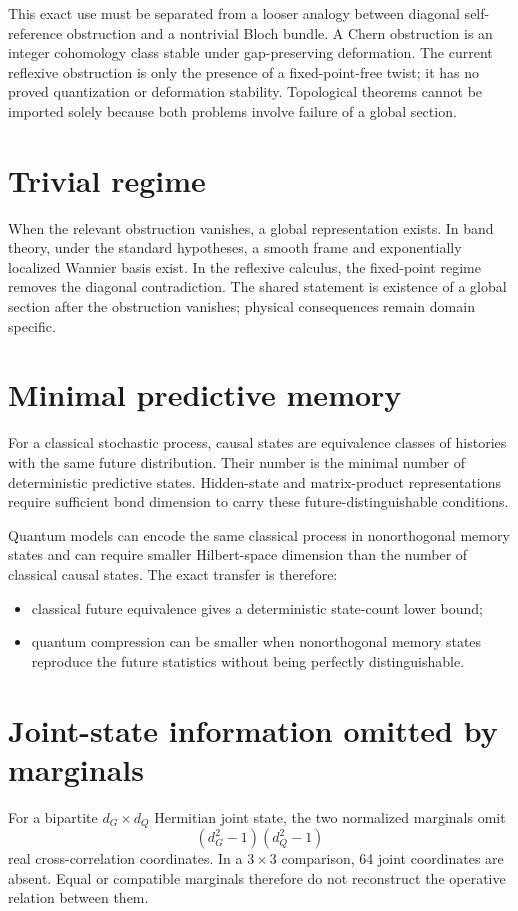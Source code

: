 \documentclass[11pt,a4paper]{article}
\begin{document}
This exact use must be separated from a looser analogy between diagonal self-reference obstruction and a nontrivial Bloch bundle. A Chern obstruction is an integer cohomology class stable under gap-preserving deformation. The current reflexive obstruction is only the presence of a fixed-point-free twist; it has no proved quantization or deformation stability. Topological theorems cannot be imported solely because both problems involve failure of a global section.

\section{Trivial regime}
When the relevant obstruction vanishes, a global representation exists. In band theory, under the standard hypotheses, a smooth frame and exponentially localized Wannier basis exist. In the reflexive calculus, the fixed-point regime removes the diagonal contradiction. The shared statement is existence of a global section after the obstruction vanishes; physical consequences remain domain specific.

\section{Minimal predictive memory}
For a classical stochastic process, causal states are equivalence classes of histories with the same future distribution. Their number is the minimal number of deterministic predictive states. Hidden-state and matrix-product representations require sufficient bond dimension to carry these future-distinguishable conditions.

Quantum models can encode the same classical process in nonorthogonal memory states and can require smaller Hilbert-space dimension than the number of classical causal states. The exact transfer is therefore:
\begin{itemize}
\item classical future equivalence gives a deterministic state-count lower bound;
\item quantum compression can be smaller when nonorthogonal memory states reproduce the future statistics without being perfectly distinguishable.
\end{itemize}

\section{Joint-state information omitted by marginals}
For a bipartite $d_G\times d_Q$ Hermitian joint state, the two normalized marginals omit
\begin{equation}
(d_G^2-1)(d_Q^2-1)
\end{equation}
real cross-correlation coordinates. In a $3\times3$ comparison, 64 joint coordinates are absent. Equal or compatible marginals therefore do not reconstruct the operative relation between them.
\end{document}
